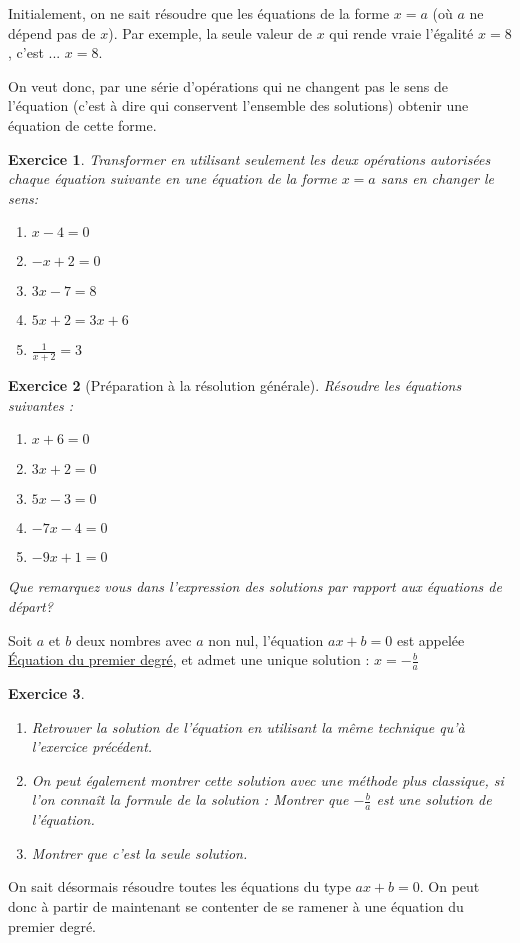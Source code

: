 \documentclass[10pt,a4paper]{book}
\newtheorem{exo}{Exercice}
\begin{document}
Initialement, on ne sait résoudre que les équations de la forme $x=a$ (où $a$ ne dépend pas de $x$).  Par exemple, la seule valeur de $x$ qui rende vraie l'égalité $x=8$, c'est ...  $x=8$.

On veut donc, par une série d'opérations qui ne changent pas le sens de l'équation (c'est à dire qui conservent l'ensemble des solutions) obtenir une équation de cette forme.


\begin{exo} Transformer en utilisant seulement les deux opérations autorisées chaque équation suivante en une équation de la forme $x=a$ sans en changer le sens:
    \begin{enumerate}
        \item $x - 4 = 0$
        \item $-x + 2 = 0$
        \item $ 3x - 7 = 8$
        \item $ 5x + 2 = 3x + 6$
        \item $ \frac{1}{x+2} = 3$
    \end{enumerate}
\end{exo}


\begin{exo}[Préparation à la résolution générale] 
    Résoudre les équations suivantes :
    \begin{enumerate}
        \item $x+6 = 0$
        \item $3x+2 = 0$
        \item $5x-3 = 0$
        \item $-7x - 4 = 0$
        \item $-9x + 1 = 0$
    \end{enumerate}
    Que remarquez vous dans l'expression des solutions par rapport aux équations de départ?
\end{exo}


\begin{prop}
    Soit $a$ et $b$ deux nombres avec $a$ non nul, l'équation $ax+b=0$ est appelée \underline{\'Equation du premier degré}, et admet une unique solution : $x = -\frac{b}{a}$
\end{prop}


\begin{exo} 
    \begin{enumerate}
        \item Retrouver la solution de l'équation en utilisant la même technique qu'à l'exercice précédent.
        \item On peut également montrer cette solution avec une méthode plus classique, si l'on connaît la formule de la solution : Montrer que $-\frac{b}{a}$ est une solution de l'équation.
        \item Montrer que c'est la seule solution.
    \end{enumerate}
\end{exo}

On sait désormais résoudre toutes les équations du type $ax+b=0$. On peut donc à partir de maintenant se contenter de se ramener à une équation du premier degré.
\end{document}
